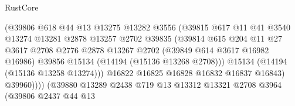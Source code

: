 \begin{lexlean}{RustCore}
\begin{coremodule}
                                      (@39806
                                        @618
                                        @44
                                        @13
                                        @13275
                                        @13282
                                        @3556
                                        (@39815
                                          @617
                                          @11
                                          @41
                                          @3540
                                          @13274
                                          @13281
                                          @2878
                                          @13257
                                          @2702
                                          @39835
                                          (@39814
                                            @615
                                            @204
                                            @11
                                            @27
                                            @3617
                                            @2708
                                            @2776
                                            @2878
                                            @13267
                                            @2702
                                            (@39849 @614 @3617 @16982 @16986)
                                            @39856
                                            @15134
                                            (@14194 (@15136 @13268 @2708)))
                                          @15134
                                          (@14194 (@15136 @13258 @13274)))
                                        @16822
                                        @16825
                                        @16828
                                        @16832
                                        @16837
                                        @16843)
                                      @39960))))
                              (@39880
                                @13289
                                @2438
                                @719
                                @13
                                @13312
                                @13321
                                @2708
                                @3964
                                (@39806
                                  @2437
                                  @44
                                  @13

\end{coremodule}
\end{lexlean}
